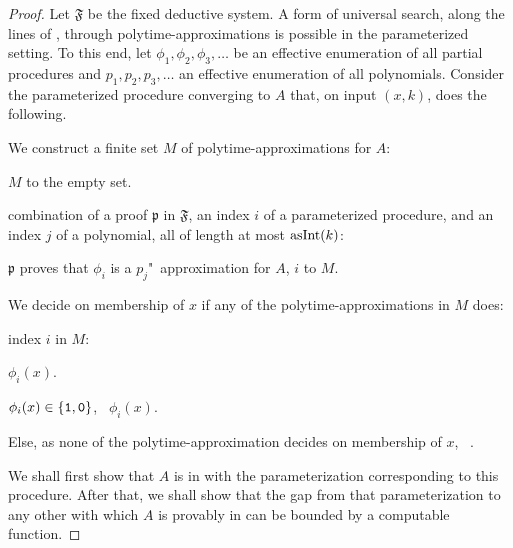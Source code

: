 \begin{proof}
  Let $\mathfrak{F}$ be the fixed deductive system.
  A form of universal search, along the lines of \textcite{hutter2002fastest}, through polytime-approximations is possible in the parameterized setting.
  To this end, let $\phi_1, \phi_2, \phi_3, \ldots$ be an effective enumeration of all partial procedures and $p_1, p_2, p_3, \ldots$ an effective enumeration of all polynomials.
  Consider the parameterized procedure converging to $A$ that, on input $(x, k)$, does the following.
  \begin{codelisting}
  \item
    We construct a finite set $M$ of polytime-approximations for $A$:
    \begin{codelisting}
    \item
       $M$ to the empty set.
    \item
       combination of a proof $\mathfrak{p}$ in $\mathfrak{F}$, an index $i$ of a parameterized procedure, and an index $j$ of a polynomial, all of length at most $\asNat(k)$:
      \begin{codelisting}
      \item\label{code:xpprincipal:approximations}
         $\mathfrak{p}$ proves that $\phi_i$ is a $p_j$"~approximation for $A$,
        \itemcont {} $i$ to $M$.
      \end{codelisting}
    \end{codelisting}
  \item
    We decide on membership of $x$ if any of the polytime-approximations in $M$ does:
    \begin{codelisting}
    \item
       index $i$ in $M$:
      \begin{codelisting}
      \item
         $\phi_i(x)$.
      \item
         $\phi_i(x) \in \{\bits{1}, \bits{0}\}$, ~$\phi_i(x)$.
      \end{codelisting}
    \item
      Else, as none of the polytime-approximation decides on membership of $x$, ~.
    \end{codelisting}
  \end{codelisting}

  We shall first show that $A$ is in  with the parameterization corresponding to this procedure.
  After that, we shall show that the gap from that parameterization to any other with which $A$ is provably in  can be bounded by a computable function.


\end{proof}
